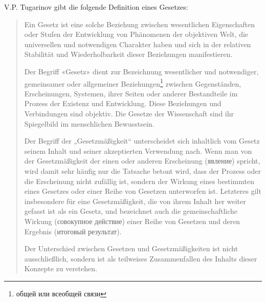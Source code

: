 \documentclass[11pt,a4paper]{article}
\begin{document}
V.P. Tugarinov gibt die folgende Definition eines Gesetzes: 
\begin{quote}
  Ein Gesetz ist eine solche Beziehung zwischen wesentlichen Eigenschaften
  oder Stufen der Entwicklung von Phänomenen der objektiven Welt, die
  universellen und notwendigen Charakter haben und sich in der relativen
  Stabilität und Wiederholbarkeit dieser Beziehungen manifestieren.

  Der Begriff «Gesetz» dient zur Bezeichnung wesentlicher und notwendiger,
  gemeinsamer oder allgemeiner
  Beziehungen\footnote{\foreignlanguage{russian}{общей или всеобщей связи}}
  zwischen Gegenständen, Erscheinungen, Systemen, ihrer Seiten oder anderer
  Bestandteile im Prozess der Existenz und Entwicklung. Diese Beziehungen und
  Verbindungen sind objektiv. Die Gesetze der Wissenschaft sind ihr
  Spiegelbild im menschlichen Bewusstsein.

  Der Begriff der „Gesetzmäßigkeit“ unterscheidet sich inhaltlich vom Gesetz
  seinem Inhalt und seiner akzeptierten Verwendung nach. Wenn man von der
  Gesetzmäßigkeit der einen oder anderen Erscheinung
  (\foreignlanguage{russian}{явление}) spricht, wird damit sehr häufig nur die
  Tatsache betont wird, dass der Prozess oder die Erscheinung nicht zufällig
  ist, sondern der Wirkung eines bestimmten eines Gesetzes oder einer Reihe
  von Gesetzen unterworfen ist. Letzteres gilt insbesondere für eine
  Gesetzmäßigkeit, die von ihrem Inhalt her weiter gefasst ist als ein Gesetz,
  und bezeichnet auch die gemeinschaftliche Wirkung
  (\foreignlanguage{russian}{совокупное действие}) einer Reihe von Gesetzen und
  deren Ergebnis (\foreignlanguage{russian}{итоговый результат}).

  Der Unterschied zwischen Gesetzen und Gesetzmäßigkeiten ist nicht
  ausschließlich, sondern ist als teilweises Zusammenfallen des Inhalts dieser
  Konzepte zu verstehen.
\end{quote}
\end{document}
